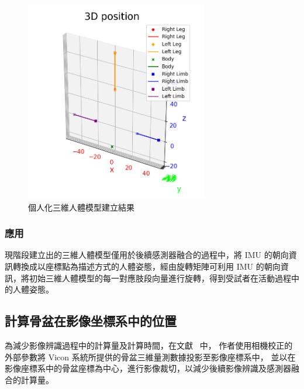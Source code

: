 
\begin{figure}[!ht]
   \centering
   \includegraphics[width=8cm]{figure/ch3_fig_my_skeleton.png}
   \caption[個人化三維人體模型建立結果]{個人化三維人體模型建立結果}
   \label{ch3_fig_my_skeleton}
\end{figure}

\subsubsection{應用}
現階段建立出的三維人體模型僅用於後續感測器融合的過程中，將 IMU 的朝向資訊轉換成以座標點為描述方式的人體姿態，經由旋轉矩陣可利用 IMU 的朝向資訊，將初始三維人體模型的每一對應肢段向量進行旋轉，得到受試者在活動過程中的人體姿態。

\clearpage

\subsection{計算骨盆在影像坐標系中的位置}
為減少影像辨識過程中的計算量及計算時間，在文獻~\cite{Zhang_2020_CVPR} 中，
作者使用相機校正的外部參數將 Vicon 系統所提供的骨盆三維量測數據投影至影像座標系中，
並以在影像座標系中的骨盆座標為中心，進行影像裁切，以減少後續影像辨識及感測器融合的計算量。

